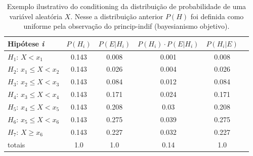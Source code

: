 \documentclass[./main.tex]{subfiles}
\begin{document}
\begin{table}[t]
    \centering	
    \small
    \sffamily
    \begin{tabular}{ l c c c c c } %
        \toprule
        \textbf{Hipótese \textit{i}} & \textbf{$P(H_i)$} & \textbf{$P(E | H_i)$} & \textbf{$P(H_i) \cdot P(E | H_i)$} & \textbf{$P(H_i | E)$}\\ 
        \midrule
        $H_1$: $X < x_1$ & 0.143 & 0.008 & 0.001 & 0.008\\ 
        $H_2$: $x_1 \leq X < x_2$ & 0.143 & 0.026 & 0.004 & 0.026\\ 
        $H_3$: $x_2 \leq X < x_3$ & 0.143 & 0.084 & 0.012 & 0.084\\ 
        $H_4$: $x_3 \leq X < x_4$ & 0.143 & 0.171 & 0.024 & 0.171\\ 
        $H_5$: $x_4 \leq X < x_5$ & 0.143 & 0.208 & 0.03 & 0.208\\ 
        $H_6$: $x_5 \leq X < x_6$ & 0.143 & 0.275 & 0.039 & 0.275\\ 
        $H_7$: $X \geq x_6$ & 0.143 & 0.227 & 0.032 & 0.227\\ 
        \midrule
        totais & 1.0 & 1.0 & 0.14 & 1.0\\
        \bottomrule
    \end{tabular}
    \caption[Exemplo \gls{conditioning} objetivo]{
    Exemplo ilustrativo do \gls{conditioning} da distribuição de probabilidade de uma variável aleatória $X$. Nesse a distribuição anterior $P(H)$ foi definida como uniforme pela observação do \gls{princip-indif} (bayesianismo objetivo).
    }
    \label{tbl:objective}
\end{table} 
\end{document}
